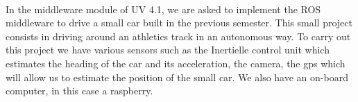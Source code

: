 \paragraph{}In the middleware module of UV 4.1, we are asked to implement the ROS middleware to drive a small car built in the previous semester. This small project consists in driving around an athletics track in an autonomous way. To carry out this project we have various sensors such as the Inertielle control unit which estimates the heading of the car and its acceleration, the camera, the gps which will allow us to estimate the position of the small car. We also have an on-board computer, in this case a raspberry.
